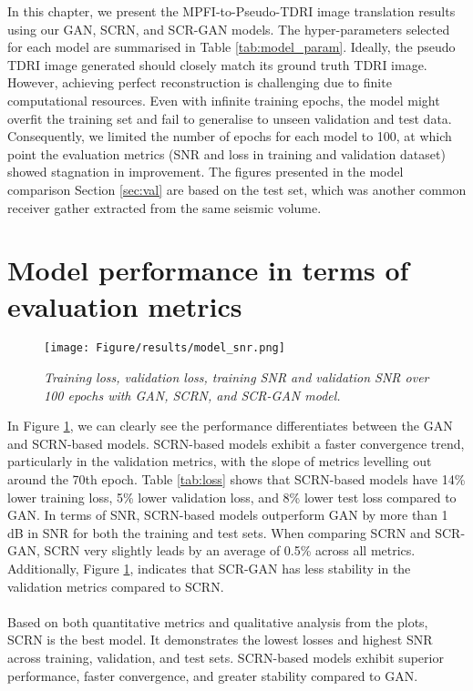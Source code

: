 In this chapter, we present the MPFI-to-Pseudo-TDRI image translation results using our GAN, SCRN, and SCR-GAN models. The hyper-parameters selected for each model are summarised in Table \ref{tab:model_param}. Ideally, the pseudo TDRI image generated should closely match its ground truth TDRI image. However, achieving perfect reconstruction is challenging due to finite computational resources. Even with infinite training epochs, the model might overfit the training set and fail to generalise to unseen validation and test data. Consequently, we limited the number of epochs for each model to 100, at which point the evaluation metrics (SNR and loss in training and validation dataset) showed stagnation in improvement. The figures presented in the model comparison Section \ref{sec:val} are based on the test set, which was another common receiver gather extracted from the same seismic volume. 

\section{Model performance in terms of evaluation metrics}
\begin{figure}[ht]
	\centering
	\texttt{[image: Figure/results/model\_snr.png]} %
	\caption{\textit{Training loss, validation loss, training SNR and validation SNR over 100 epochs with GAN, SCRN, and SCR-GAN model.}}
	\label{fig:model_snr}
\end{figure}

\noindent In Figure \ref{fig:model_snr}, we can clearly see the performance differentiates between the GAN and SCRN-based models. SCRN-based models exhibit a faster convergence trend, particularly in the validation metrics, with the slope of metrics levelling out around the 70th epoch.  Table \ref{tab:loss} shows that SCRN-based models have 14\% lower training loss, 5\% lower validation loss, and 8\% lower test loss compared to GAN. In terms of SNR, SCRN-based models outperform GAN by more than 1 dB in SNR for both the training and test sets. When comparing SCRN and SCR-GAN, SCRN very slightly leads by an average of 0.5\% across all metrics. Additionally, Figure \ref{fig:model_snr}, indicates that SCR-GAN has less stability in the validation metrics compared to SCRN.
\\\\
Based on both quantitative metrics and qualitative analysis from the plots, SCRN is the best model. It demonstrates the lowest losses and highest SNR across training, validation, and test sets. SCRN-based models exhibit superior performance, faster convergence, and greater stability compared to GAN.

